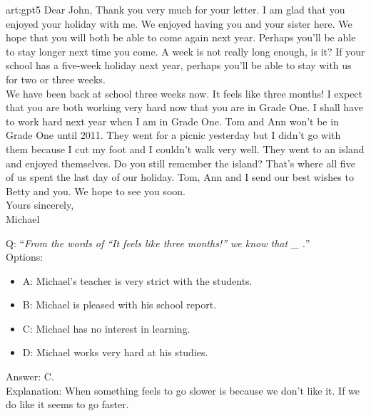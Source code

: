 \begin{passage}{art:gpt5}
 Dear John, Thank you very much for your letter. I am glad that you enjoyed your holiday with me. We enjoyed having you and your sister here. We hope that you will both be able to come again next year. Perhaps you'll be able to stay longer next time you come. A week is not really long enough, is it? If your school has a five-week holiday next year, perhaps  you'll be able to stay with us for two or three weeks. \\
We have been back at school three weeks now. It feels like three months! I expect  that you are both working very hard now that you are in Grade One. I shall have to work hard next year when I am in Grade One. Tom and Ann won't be in Grade One until 2011.
They went for a picnic yesterday but I didn't go with them because I cut my foot and I couldn't walk very well. They went to an island and enjoyed themselves. Do you still remember the island? That's where all five of us spent the last day of our holiday.
Tom, Ann and I send our best wishes to Betty and you. We hope to see you soon. \\
Yours sincerely, \\
Michael
\end{passage}
Q: ``\emph{From the words of  ``It feels like three months!'' we know that  \_  .}''\\
Options: 
\begin{itemize} 
 \item A: Michael's teacher is very strict with the students.
 \item B: Michael is pleased with his school report.
 \item C: Michael has no interest in learning.
 \item D: Michael works very hard at his studies.
\end{itemize}
Answer: C. \\
Explanation: When something feels to go slower is because we don't like it. If we do like it seems to go faster.
